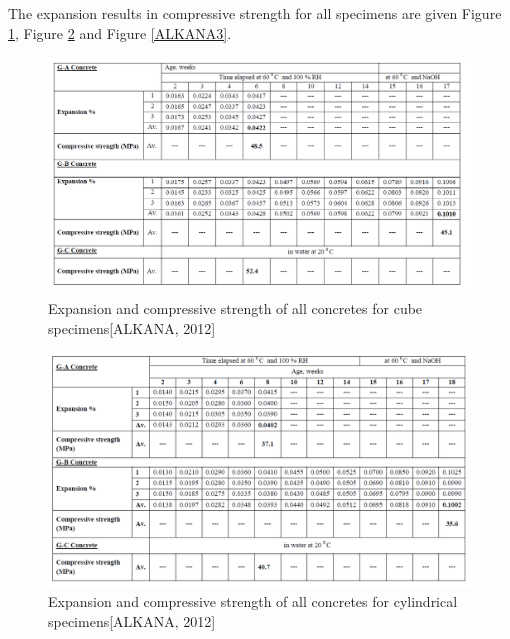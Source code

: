 The expansion results in compressive strength for all specimens are given Figure \ref{ALKANA1}, Figure \ref{ALKANA2} and Figure \ref{ALKANA3}.

\begin{figure}[h!]
  \centering
  \includegraphics[width=1.0\linewidth]{Reference/ALKANASR1.png}
  \caption{Expansion and compressive strength of all concretes for cube specimens[ALKANA, 2012]}
  \label{ALKANA1}
\end{figure}

\begin{figure}[h!]
  \centering
  \includegraphics[width=1.0\linewidth]{Reference/ALKANASR2.png}
  \caption{Expansion and compressive strength of all concretes for cylindrical specimens[ALKANA, 2012]}
  \label{ALKANA2}
\end{figure}

